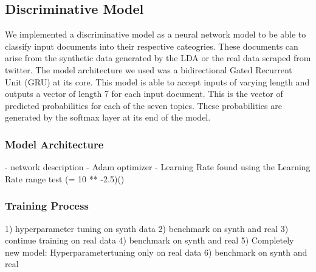 \documentclass[11pt]{article}
\begin{document}
\subsection{Discriminative Model}
We implemented a discriminative model as a neural network model to be able to classify input documents into their respective cateogries. These documents can arise from the synthetic data generated by the LDA or the real data scraped from twitter. The model architecture we used was a bidirectional Gated Recurrent Unit (GRU) at its core. This model is able to accept inputs of varying length and outputs a vector of length 7 for each input document. This is the vector of predicted probabilities for each of the seven topics. These probabilities are generated by the softmax layer at its end of the model.  


\subsubsection{Model Architecture}
- network description
- Adam optimizer
- Learning Rate found using the Learning Rate range test (= 10 ** -2.5)(\cite{smith2018disciplined})


	
 	

\subsubsection{Training Process}
1) hyperparameter tuning on synth data
2) benchmark on synth and real
3) continue training on real data
4) benchmark on synth and real
5) Completely new model: Hyperparametertuning only on real data
6) benchmark on synth and real
\end{document}
